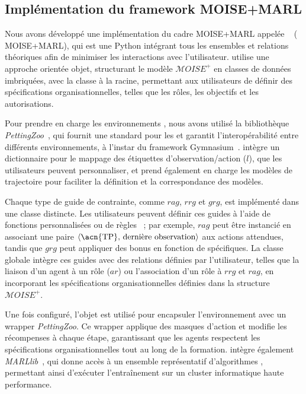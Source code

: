 \subsection{Implémentation du framework MOISE+MARL}

Nous avons développé une implémentation du cadre MOISE+MARL appelée ~\hyperref[fn:github]{\footnotemark[2]} ( MOISE+MARL), qui est une  Python intégrant tous les ensembles et relations théoriques afin de minimiser les interactions avec l'utilisateur.  utilise une approche orientée objet, structurant le modèle $\mathcal{M}OISE^+$ en classes de données imbriquées, avec la classe  à la racine, permettant aux utilisateurs de définir des spécifications organisationnelles, telles que les rôles, les objectifs et les autorisations.


Pour prendre en charge les environnements , nous avons utilisé la bibliothèque \textit{PettingZoo}~\cite{terry2020pettingzoo}, qui fournit une  standard pour les  et garantit l'interopérabilité entre différents environnements, à l'instar du framework Gymnasium~\cite{kwiatkowski2024}.  intègre un dictionnaire pour le mappage des étiquettes d'observation/action ($l$), que les utilisateurs peuvent personnaliser, et prend également en charge les modèles de trajectoire  pour faciliter la définition et la correspondance des modèles.

Chaque type de guide de contrainte, comme $rag$, $rrg$ et $grg$, est implémenté dans une classe distincte. Les utilisateurs peuvent définir ces guides à l'aide de fonctions personnalisées ou de règles ~; par exemple, $rag$ peut être instancié en associant une paire $\langle \text{\acn{TP}, dernière observation} \rangle$ aux actions attendues, tandis que $grg$ peut appliquer des bonus en fonction de  spécifiques. La classe globale  intègre ces guides avec des relations définies par l'utilisateur, telles que la liaison d'un agent à un rôle ($ar$) ou l'association d'un rôle à $rrg$ et $rag$, en incorporant les spécifications organisationnelles définies dans la structure $\mathcal{M}OISE^+$.

Une fois configuré, l'objet  est utilisé pour encapsuler l'environnement avec un wrapper \textit{PettingZoo}. Ce wrapper applique des masques d'action et modifie les récompenses à chaque étape, garantissant que les agents respectent les spécifications organisationnelles tout au long de la formation.  intègre également \textit{MARLlib}~\cite{hu2021marlib}, qui donne accès à un ensemble représentatif d'algorithmes , permettant ainsi d'exécuter l'entraînement sur un cluster informatique haute performance.

